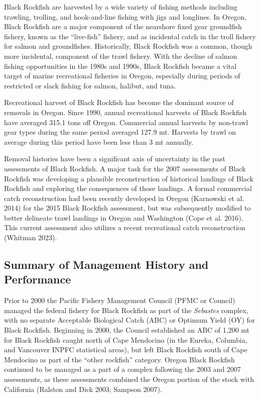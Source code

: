 \documentclass[11pt,
  english,
  letterpaper,
]{article}
\begin{document}
Black Rockfish are harvested by a wide variety of fishing methods including trawling, trolling, and hook-and-line fishing with jigs and longlines. In Oregon, Black Rockfish are a major component of the nearshore fixed gear groundfish fishery, known as the ``live-fish'' fishery, and as incidental catch in the troll fishery for salmon and groundfishes. Historically, Black Rockfish was a common, though more incidental, component of the trawl fishery. With the decline of salmon fishing opportunities in the 1980s and 1990s, Black Rockfish became a vital target of marine recreational fisheries in Oregon, especially during periods of restricted or slack fishing for salmon, halibut, and tuna.

Recreational harvest of Black Rockfish has become the dominant source of removals in Oregon. Since 1990, annual recreational harvests of Black Rockfish have averaged 315.1 tons off Oregon. Commercial annual harvests by non-trawl gear types during the same period averaged 127.9 mt. Harvests by trawl on average during this period have been less than 3 mt annually.

Removal histories have been a significant axis of uncertainty in the past assessments of Black Rockfish. A major task for the 2007 assessments of Black Rockfish was developing a plausible reconstruction of historical landings of Black Rockfish and exploring the consequences of those landings. A formal commercial catch reconstruction had been recently developed in Oregon (Karnowski et al. 2014) for the 2015 Black Rockfish assessment, but was subsequently modified to better delineate trawl landings in Oregon and Washington (Cope et al. 2016). This current assessment also utilizes a recent recreational catch reconstruction (Whitman 2023).

\hypertarget{summary-of-management-history-and-performance}{%
\subsection{Summary of Management History and Performance}\label{summary-of-management-history-and-performance}}

Prior to 2000 the Pacific Fishery Management Council (PFMC or Council) managed the federal fishery for Black Rockfish as part of the \emph{Sebastes} complex, with no separate Acceptable Biological Catch (ABC) or Optimum Yield (OY) for Black Rockfish. Beginning in 2000, the Council established an ABC of 1,200 mt for Black Rockfish caught north of Cape Mendocino (in the Eureka, Columbia, and Vancouver INPFC statistical areas), but left Black Rockfish south of Cape Mendocino as part of the ``other rockfish'' category. Oregon Black Rockfish continued to be managed as a part of a complex following the 2003 and 2007 assessments, as these assessments combined the Oregon portion of the stock with California (Ralston and Dick 2003; Sampson 2007).
\end{document}
